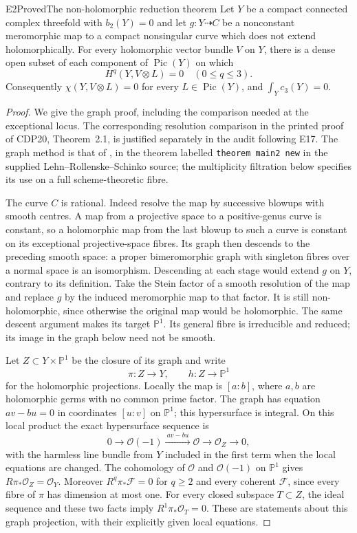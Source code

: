\begin{statement}{E2}{Proved}{The non-holomorphic reduction theorem}
Let $Y$ be a compact connected complex threefold with $b_2(Y)=0$ and
let $g:Y\dashrightarrow C$ be a nonconstant meromorphic map to a
compact nonsingular curve which does not extend holomorphically.
For every holomorphic vector bundle $V$ on $Y$, there is a dense open
subset of each component of $\operatorname{Pic}(Y)$ on which
\[
 H^q(Y,V\otimes L)=0\quad(0\leq q\leq3).
\]
Consequently $\chi(Y,V\otimes L)=0$ for every $L\in\operatorname{Pic}(Y)$,
and $\int_Yc_3(Y)=0$.
\end{statement}
\begin{proof}
We give the graph proof, including the comparison needed at the
exceptional locus. The corresponding resolution comparison in the
printed proof of CDP20, Theorem~2.1, is justified separately in the
audit following E17. The graph method is that of \cite{LRS2019}, in the theorem labelled
\texttt{theorem main2 new} in the supplied Lehn--Rollenske--Schinko
source; the multiplicity filtration below specifies its use on a full
scheme-theoretic fibre.

The curve $C$ is rational. Indeed resolve the map by successive blowups
with smooth centres. A map from a projective space to a positive-genus
curve is constant, so a holomorphic map from the last blowup to such a
curve is constant on its exceptional projective-space fibres. Its graph
then descends to the preceding smooth space: a proper bimeromorphic
graph with singleton fibres over a normal space is an isomorphism.
Descending at each stage would extend $g$ on $Y$, contrary to its
definition. Take the Stein factor of a smooth resolution of the map
and replace $g$ by the induced meromorphic map to that factor. It
is still non-holomorphic, since otherwise the original map would
be holomorphic. The same descent argument makes its target
$\mathbb P^1$. Its general fibre is irreducible and reduced;
its image in the graph below need not be smooth.

Let $Z\subset Y\times\mathbb P^1$ be the closure of its graph and write
\[
 \pi:Z\to Y,\qquad h:Z\to\mathbb P^1
\]
for the holomorphic projections. Locally the map is $[a:b]$, where
$a,b$ are holomorphic germs with no common prime factor. The graph has
equation $av-bu=0$ in coordinates $[u:v]$ on $\mathbb P^1$; this
hypersurface is integral. On this local product the exact hypersurface
sequence is
\[
 0\to\mathcal O(-1)\xrightarrow{\ av-bu\ }\mathcal O
 \to\mathcal O_Z\to0,
\]
with the harmless line bundle from $Y$ included in the first term when
the local equations are changed. The cohomology of $\mathcal O$ and
$\mathcal O(-1)$ on $\mathbb P^1$ gives
$R\pi_*\mathcal O_Z=\mathcal O_Y$. Moreover $R^q\pi_*\mathcal F=0$
for $q\geq2$ and every coherent $\mathcal F$, since every fibre of
$\pi$ has dimension at most one. For every closed subspace $T\subset Z$,
the ideal sequence and these two facts imply
$R^1\pi_*\mathcal O_T=0$. These are statements about this graph
projection, with their explicitly given local equations.


\end{proof}
